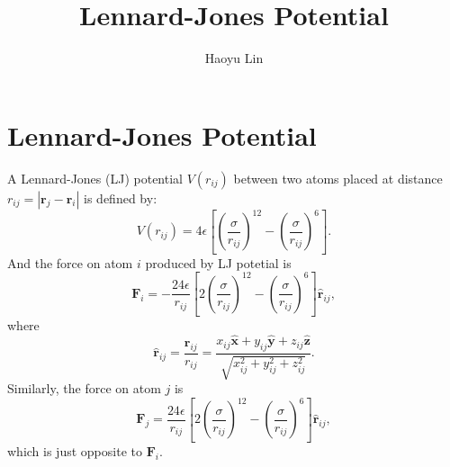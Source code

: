 \documentclass[a4paper,11pt]{article}
\author{Haoyu Lin}
\title{Lennard-Jones Potential}
\begin{document}
\maketitle


\section{Lennard-Jones Potential}
A Lennard-Jones (LJ) potential $V(r_{ij})$ between two atoms placed at distance $r_{ij} = |\mathbf{r}_j - \mathbf{r}_i|$ is defined by:
\begin{equation}
    V(r_{ij}) = 4 \epsilon \left[ \left( \frac{\sigma}{r_{ij}} \right)^{12} - \left( \frac{\sigma}{r_{ij}} \right)^{6} \right].
\end{equation}
And the force on atom $i$ produced by LJ potetial is
\begin{equation}
    \mathbf{F}_i = - \frac{24 \epsilon}{r_{ij}} \left[ 2\left( \frac{\sigma}{r_{ij}} \right)^{12} - \left( \frac{\sigma}{r_{ij}} \right)^{6} \right] \hat{\mathbf{r}}_{ij},
\end{equation}
where
\begin{equation}
    \hat{\mathbf{r}}_{ij} = \frac{\mathbf{r}_{ij}}{r_{ij}} = \frac{x_{ij}\hat{\mathbf{x}} + y_{ij}\hat{\mathbf{y}} + z_{ij}\hat{\mathbf{z}}}{\sqrt{x_{ij}^2 + y_{ij}^2 + z_{ij}^2}}.
\end{equation}
Similarly, the force on atom $j$ is
\begin{equation}
    \mathbf{F}_j = \frac{24 \epsilon}{r_{ij}} \left[ 2\left( \frac{\sigma}{r_{ij}} \right)^{12} - \left( \frac{\sigma}{r_{ij}} \right)^{6} \right] \hat{\mathbf{r}}_{ij},
\end{equation}
which is just opposite to $\mathbf{F}_i$.
\end{document}
